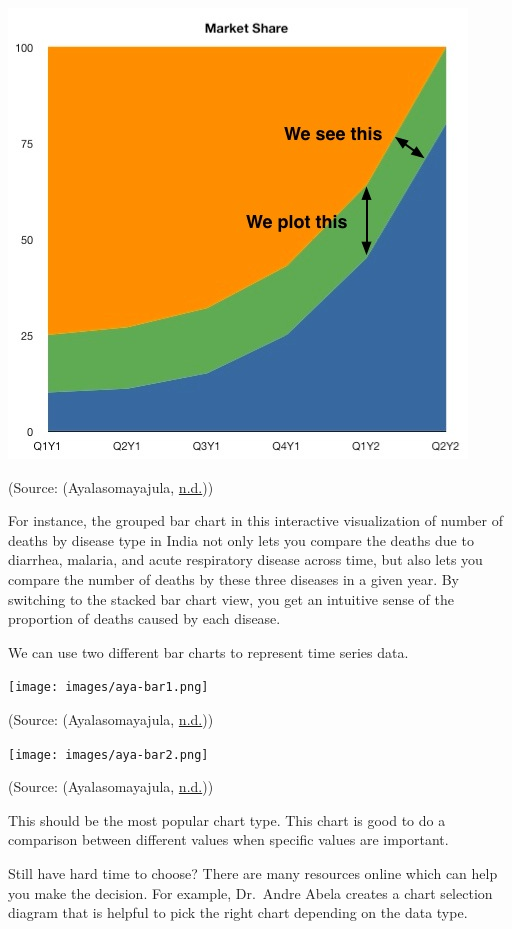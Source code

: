 \documentclass[]{book}
\begin{document}
\includegraphics{images/aya-stacked-perception_clear_graph.jpg}

(Source: (Ayalasomayajula, \protect\hyperlink{ref-aya-time-series}{n.d.}))

For instance, the grouped bar chart in this interactive visualization of number of deaths by disease type in India not only lets you compare the deaths due to diarrhea, malaria, and acute respiratory disease across time, but also lets you compare the number of deaths by these three diseases in a given year. By switching to the stacked bar chart view, you get an intuitive sense of the proportion of deaths caused by each disease.

We can use two different bar charts to represent time series data.

\texttt{[image: images/aya-bar1.png]}

(Source: (Ayalasomayajula, \protect\hyperlink{ref-aya-time-series}{n.d.}))

\texttt{[image: images/aya-bar2.png]}

(Source: (Ayalasomayajula, \protect\hyperlink{ref-aya-time-series}{n.d.}))

This should be the most popular chart type. This chart is good to do a comparison between different values when specific values are important.

Still have hard time to choose? There are many resources online which can help you make the decision. For example, Dr.~Andre Abela creates a chart selection diagram that is helpful to pick the right chart depending on the data type.
\end{document}
